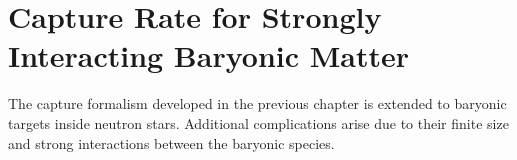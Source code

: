 \graphicspath{{img/capture_baryons/}}

\chapter{Capture Rate for Strongly Interacting Baryonic Matter}
\label{chapter:capture_baryons}

\begin{synopsis}
   The capture formalism developed in the previous chapter is extended to baryonic targets inside neutron stars. Additional complications arise due to their finite size and strong interactions between the baryonic species.  
\end{synopsis}
